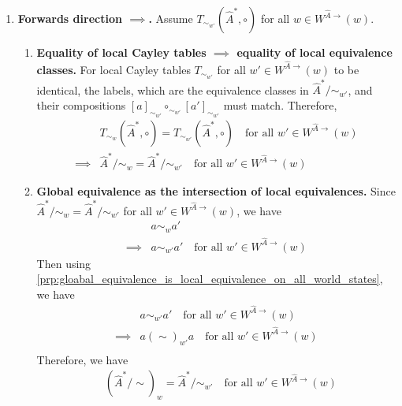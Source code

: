 \begin{proofE}
\begin{enumerate}
    \item \textbf{Forwards direction $\implies$.}
    Assume $T_{\sim_{w'}}(\hat{A}^{*}, \circ)$ for all $w \in W^{\hat{A}\to}(w)$.
    \begin{enumerate}
        \item \textbf{Equality of local Cayley tables $\implies$ equality of local equivalence classes.}
        For local Cayley tables $T_{\sim_{w'}}$ for all $w' \in W^{\hat{A}\to}(w)$ to be identical, the labels, which are the equivalence classes in $\hat{A}^{*}/\sim_{w'}$, and their compositions $[a]_{\sim_{w'}} \circ_{\sim_{w'}} [a']_{\sim_{w'}}$ must match.
        Therefore,
        \begin{align}
            & T_{\sim_{w}}(\hat{A}^{*}, \circ) = T_{\sim_{w'}}(\hat{A}^{*}, \circ) \quad \text{for all $w' \in W^{\hat{A}\to}(w)$} \\
            \implies & \hat{A}^{*}/\sim_{w} = \hat{A}^{*}/\sim_{w'} \quad \text{for all $w' \in W^{\hat{A}\to}(w)$}
        \end{align}

        \item \textbf{Global equivalence as the intersection of local equivalences.}
        Since $\hat{A}^{*}/\sim_{w} = \hat{A}^{*}/\sim_{w'}$ for all $w' \in W^{\hat{A}\to}(w)$, we have
        \begin{align}
            & a \sim_{w} a' \\
            \implies & a \sim_{w'} a' \quad \text{for all $w' \in W^{\hat{A}\to}(w)$}
        \end{align}
        Then using \cref{prp:gloabal_equivalence_is_local_equivalence_on_all_world_states}, we have
        \begin{align}
            & a \sim_{w'} a' \quad \text{for all $w' \in W^{\hat{A}\to}(w)$} \\
            \implies & a (\sim)_{w'} a \quad \text{for all $w' \in W^{\hat{A}\to}(w)$} \\
        \end{align}
        Therefore, we have
        \begin{align}
            & (\hat{A}^{*}/\sim)_{w} = \hat{A}^{*}/\sim_{w'} \quad \text{for all $w' \in W^{\hat{A}\to}(w)$} \\
        \end{align}
    \end{enumerate}


\end{enumerate}
\end{proofE}
